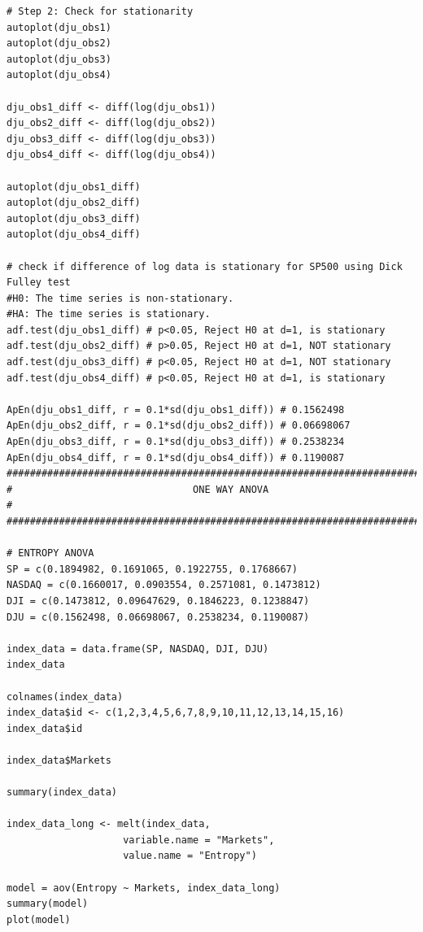 \documentclass{article}[12pt]
\begin{document}
\begin{appendices}
\begin{lstlisting}
# Step 2: Check for stationarity
autoplot(dju_obs1)
autoplot(dju_obs2)
autoplot(dju_obs3)
autoplot(dju_obs4)

dju_obs1_diff <- diff(log(dju_obs1))
dju_obs2_diff <- diff(log(dju_obs2))
dju_obs3_diff <- diff(log(dju_obs3))
dju_obs4_diff <- diff(log(dju_obs4))

autoplot(dju_obs1_diff)
autoplot(dju_obs2_diff)
autoplot(dju_obs3_diff)
autoplot(dju_obs4_diff)

# check if difference of log data is stationary for SP500 using Dick Fulley test
#H0: The time series is non-stationary.
#HA: The time series is stationary.
adf.test(dju_obs1_diff) # p<0.05, Reject H0 at d=1, is stationary
adf.test(dju_obs2_diff) # p>0.05, Reject H0 at d=1, NOT stationary
adf.test(dju_obs3_diff) # p<0.05, Reject H0 at d=1, NOT stationary
adf.test(dju_obs4_diff) # p<0.05, Reject H0 at d=1, is stationary

ApEn(dju_obs1_diff, r = 0.1*sd(dju_obs1_diff)) # 0.1562498
ApEn(dju_obs2_diff, r = 0.1*sd(dju_obs2_diff)) # 0.06698067
ApEn(dju_obs3_diff, r = 0.1*sd(dju_obs3_diff)) # 0.2538234
ApEn(dju_obs4_diff, r = 0.1*sd(dju_obs4_diff)) # 0.1190087
################################################################################
#                               ONE WAY ANOVA                                  #
################################################################################

# ENTROPY ANOVA
SP = c(0.1894982, 0.1691065, 0.1922755, 0.1768667)
NASDAQ = c(0.1660017, 0.0903554, 0.2571081, 0.1473812)
DJI = c(0.1473812, 0.09647629, 0.1846223, 0.1238847)
DJU = c(0.1562498, 0.06698067, 0.2538234, 0.1190087)

index_data = data.frame(SP, NASDAQ, DJI, DJU)
index_data

colnames(index_data)
index_data$id <- c(1,2,3,4,5,6,7,8,9,10,11,12,13,14,15,16)
index_data$id

index_data$Markets

summary(index_data)

index_data_long <- melt(index_data, 
                    variable.name = "Markets", 
                    value.name = "Entropy") 

model = aov(Entropy ~ Markets, index_data_long)
summary(model)
plot(model)




                        \end{lstlisting}
                    
            \end{appendices}
\end{document}
